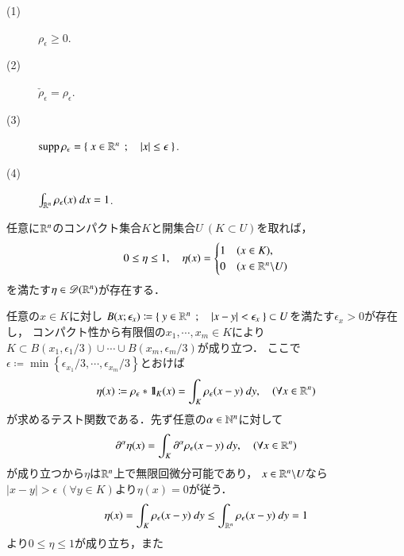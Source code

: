 	\begin{screen}
		\begin{thm}\mbox{}
			\begin{description}
				\item[(1)] $\rho_\epsilon \geq 0$.
				\item[(2)] $\check{\rho}_\epsilon = \rho_\epsilon$.
				\item[(3)] $\operatorname{supp} \rho_\epsilon = \left\{\ x \in \mathbb{R}^n\ \, ; \quad |x| \leq \epsilon\ \right\}$.
				\item[(4)] $\int_{\mathbb{R}^n} \rho_\epsilon(x)\ dx = 1$.
			\end{description}
		\end{thm}
	\end{screen}
	
	\begin{screen}
		\begin{thm}[テスト関数を任意に構成する]
		\label{construction_of_test_function}
			任意に$\mathbb{R}^n$のコンパクト集合$K$と開集合$U\ (K \subset U)$を取れば，
			\begin{align}
				0 \leq \eta \leq 1,
				\quad 
				\eta(x) =
				\begin{cases}
					1 & (x \in K), \\
					0 & (x \in \mathbb{R}^n \backslash U) 
				\end{cases}
			\end{align}
			を満たす$\eta \in \mathscr{D}(\mathbb{R}^n)$が存在する．
		\end{thm}
	\end{screen}
	
	\begin{prf}
		任意の$x \in K$に対し
		$B(x;\epsilon_x) \coloneqq \left\{\ y \in \mathbb{R}^n\ \, ; \quad |x-y| < \epsilon_x\ \right\} \subset U$を満たす$\epsilon_x > 0$が存在し，
		コンパクト性から有限個の$x_1,\cdots,x_m \in K$により$K \subset B(x_1,\epsilon_1/3) \cup \cdots \cup B(x_m,\epsilon_m/3)$が成り立つ．
		ここで$\epsilon \coloneqq \min{}{\left\{ \epsilon_{x_1}/3,\cdots,\epsilon_{x_m}/3 \right\}}$とおけば
		\begin{align}
			\eta(x) \coloneqq \rho_\epsilon \ast \mbox{1}\hspace{-0.25em}\mbox{l}_K(x) = \int_{K} \rho_\epsilon(x - y)\ dy,
			\quad (\forall x \in \mathbb{R}^n)
		\end{align}
		が求めるテスト関数である．先ず任意の$\alpha \in \mathbb{N}^n$に対して
		\begin{align}
			\partial^\alpha \eta(x) = \int_K \partial^\alpha \rho_\epsilon(x-y)\ dy,
			\quad (\forall x \in \mathbb{R}^n)
		\end{align}
		が成り立つから$\eta$は$\mathbb{R}^n$上で無限回微分可能であり，
		$x \in \mathbb{R}^n \backslash U$なら
		$|x - y| > \epsilon\ (\forall y \in K)$より$\eta(x) = 0$が従う．
		\begin{align}
			\eta(x) = \int_K \rho_\epsilon(x-y)\ dy \leq \int_{\mathbb{R}^n} \rho_\epsilon(x-y)\ dy = 1
		\end{align}
		より$0 \leq \eta \leq 1$が成り立ち，また
	\end{prf}